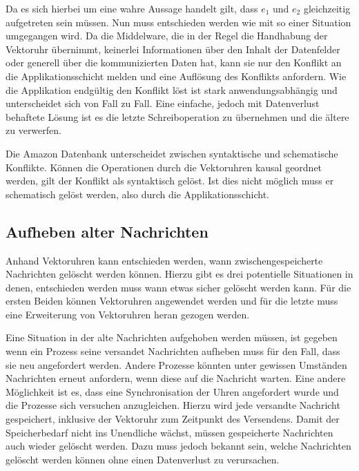 Da es sich hierbei um eine wahre Aussage handelt gilt, dass $e_1$ und $e_2$ gleichzeitig aufgetreten sein müssen.
Nun muss entschieden werden wie mit so einer Situation umgegangen wird.
Da die Middelware, die in der Regel die Handhabung der Vektoruhr übernimmt, keinerlei Informationen über den Inhalt der Datenfelder oder generell über die kommunizierten Daten hat, kann sie nur den Konflikt an die Applikationsschicht melden und eine Auflösung des Konflikts anfordern.
Wie die Applikation endgültig den Konflikt löst ist stark anwendungsabhängig und unterscheidet sich von Fall zu Fall.
Eine einfache, jedoch mit Datenverlust behaftete Lösung ist es die letzte Schreiboperation zu übernehmen und die ältere zu verwerfen.

Die Amazon Datenbank unterscheidet zwischen syntaktische und schematische Konflikte.
Können die Operationen durch die Vektoruhren kausal geordnet werden, gilt der Konflikt als syntaktisch gelöst.
Ist dies nicht möglich muss er schematisch gelöst werden, also durch die Applikationsschicht.


\subsection{Aufheben alter Nachrichten}
Anhand Vektoruhren kann entschieden werden, wann zwischengespeicherte Nachrichten gelöscht werden können.
Hierzu gibt es drei potentielle Situationen in denen, entschieden werden muss wann etwas sicher gelöscht werden kann.
Für die ersten Beiden können Vektoruhren angewendet werden und für die letzte muss eine Erweiterung von Vektoruhren heran gezogen werden.

Eine Situation in der alte Nachrichten aufgehoben werden müssen, ist gegeben wenn ein Prozess seine versandet Nachrichten aufheben muss für den Fall, dass sie neu angefordert werden.
Andere Prozesse könnten unter gewissen Umständen Nachrichten erneut anfordern, wenn diese auf die Nachricht warten.
Eine andere Möglichkeit ist es, dass eine Synchronisation der Uhren angefordert wurde und die Prozesse sich versuchen anzugleichen.
Hierzu wird jede versandte Nachricht gespeichert, inklusive der Vektoruhr zum Zeitpunkt des Versendens.
Damit der Speicherbedarf nicht ins Unendliche wächst, müssen gespeicherte Nachrichten auch wieder gelöscht werden.
Dazu muss jedoch bekannt sein, welche Nachrichten gelöscht werden können ohne einen Datenverlust zu verursachen.


